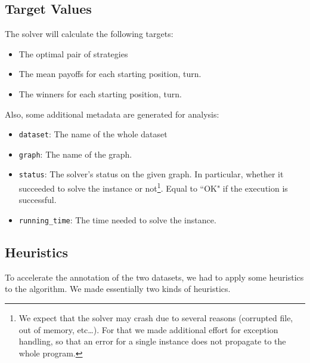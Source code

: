 \subsection{Target Values}
The solver will calculate the following targets:
\begin{itemize}
	\item The optimal pair of strategies
	\item The mean payoffs for each starting position, turn.
	\item The winners for each starting position, turn.
\end{itemize}
Also, some additional metadata are generated for analysis:
\begin{itemize}
	\item \texttt{dataset}: The name of the whole dataset
	\item \texttt{graph}: The name of the graph.
	\item \texttt{status}: The solver's status on the given graph. In particular, whether it succeeded to solve the instance or not\footnote{We expect that the solver may crash due to several reasons (corrupted file, out of memory, etc\dots). For that we made additional effort for exception handling, so that an error for a single instance does not propagate to the whole program.}. Equal to ``OK" if the execution is successful.
	\item \texttt{running\_time}: The time needed to solve the instance.

\end{itemize}

\subsection{Heuristics}
To accelerate the annotation of the two datasets, we had to apply some heuristics to the algorithm. We made essentially two kinds of heuristics.
